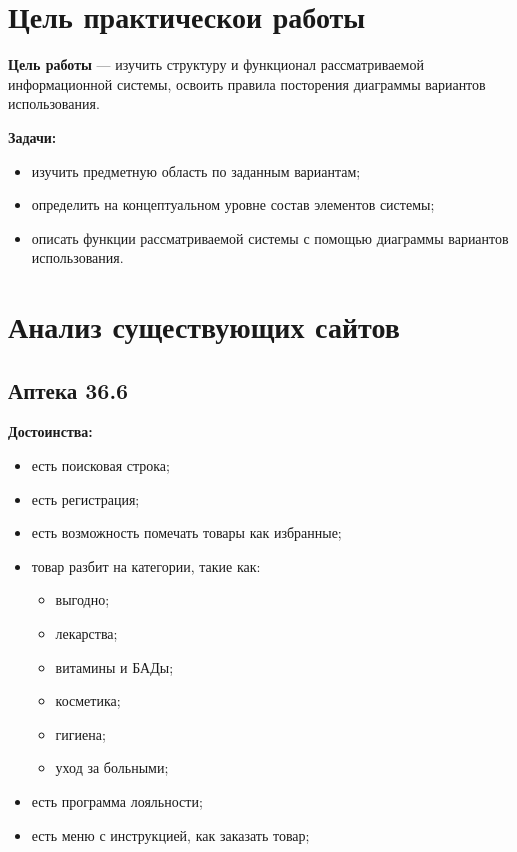 \section*{\Large Цель практическои работы}

\textbf{Цель работы} --- изучить структуру и функционал рассматриваемой
информационной системы, освоить правила посторения диаграммы вариантов
использования.

\textbf{Задачи:}\par
\begin{itemize}
	\item изучить предметную область по заданным вариантам;
	\item определить на концептуальном уровне состав элементов системы;
	\item описать функции рассматриваемой системы с помощью диаграммы 
		вариантов использования.
\end{itemize}
\newpage

\section{Анализ существующих сайтов}
\subsection{Аптека 36.6}

\textbf{Достоинства:}\par
\begin{itemize}
	\item есть поисковая строка;
	\item есть регистрация;
	\item есть возможность помечать товары как избранные;
	\item товар разбит на категории, такие как:
	\begin{itemize}
		\item выгодно;
		\item лекарства;
		\item витамины и БАДы;
		\item косметика;
		\item гигиена;
		\item уход за больными;
	\end{itemize}
	\item есть программа лояльности;
	\item есть меню с инструкцией, как заказать товар;
\end{itemize}

